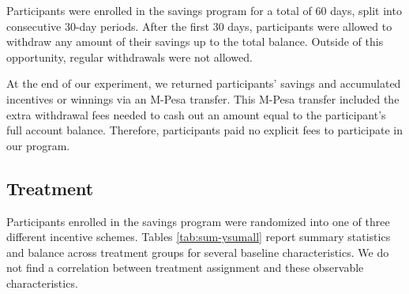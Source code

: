 \documentclass[12pt]{article}
\begin{document}
		Participants were enrolled in the savings program for a total of 60 days, split into consecutive 30-day periods. After the first 30 days, participants were allowed to withdraw any amount of their savings up to the total balance. Outside of this opportunity, regular withdrawals were not allowed.

		At the end of our experiment, we returned participants' savings and accumulated incentives or winnings via an M-Pesa transfer. This M-Pesa transfer included the extra withdrawal fees needed to cash out an amount equal to the participant's full account balance. Therefore, participants paid no explicit fees to participate in our program.

	\subsection{Treatment}

		Participants enrolled in the savings program were randomized into one of three different incentive schemes. Tables \ref{tab:sum-ysumall} report summary statistics and balance across treatment groups for several baseline characteristics. We do not find a correlation between treatment assignment and these observable characteristics.
\end{document}
